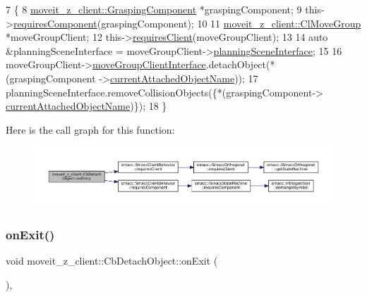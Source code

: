 \begin{DoxyCode}
7     \{
8         \hyperlink{classmoveit__z__client_1_1GraspingComponent}{moveit\_z\_client::GraspingComponent} *graspingComponent;
9         this->\hyperlink{classsmacc_1_1SmaccClientBehavior_adee6abe3a28aa6b47d3dd5267e264b4d}{requiresComponent}(graspingComponent);
10 
11         \hyperlink{classmoveit__z__client_1_1ClMoveGroup}{moveit\_z\_client::ClMoveGroup} *moveGroupClient;
12         this->\hyperlink{classsmacc_1_1SmaccClientBehavior_a917f001e763a1059af337bf4e164f542}{requiresClient}(moveGroupClient);
13 
14         \textcolor{keyword}{auto} &planningSceneInterface = moveGroupClient->\hyperlink{classmoveit__z__client_1_1ClMoveGroup_a21c879b2683286aa21ce68f40195b4b5}{planningSceneInterface};
15 
16         moveGroupClient->\hyperlink{classmoveit__z__client_1_1ClMoveGroup_af86e046b837be0ef4afa9893d8808f20}{moveGroupClientInterface}.detachObject(*(graspingComponent
      ->\hyperlink{classmoveit__z__client_1_1GraspingComponent_a963ed612bc569ee45401e38133b802eb}{currentAttachedObjectName}));
17         planningSceneInterface.removeCollisionObjects(\{*(graspingComponent->
      \hyperlink{classmoveit__z__client_1_1GraspingComponent_a963ed612bc569ee45401e38133b802eb}{currentAttachedObjectName})\});
18     \}
\end{DoxyCode}
Here is the call graph for this function\+:
\nopagebreak
\begin{figure}[H]
\begin{center}
\leavevmode
\includegraphics[width=350pt]{classmoveit__z__client_1_1CbDetachObject_a2c071ca5d2e82ef8c57d3cf2082897a2_cgraph}
\end{center}
\end{figure}
\mbox{\label{classmoveit__z__client_1_1CbDetachObject_aab785402cb3bd315521ef47f75fa0e14}} 
\subsubsection{\texorpdfstring{on\+Exit()}{onExit()}}
{\footnotesize\ttfamily void moveit\+\_\+z\+\_\+client\+::\+Cb\+Detach\+Object\+::on\+Exit (\begin{DoxyParamCaption}{ }\end{DoxyParamCaption})\hspace{0.3cm}{\ttfamily [override]}, {\ttfamily [virtual]}}



